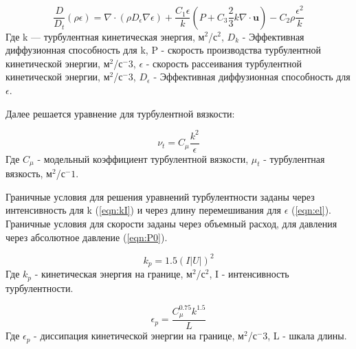 \documentclass[14pt,a4paper]{article}
\begin{document}
        \begin{equation}\label{eqn:e}
            \frac{D}{D_{t}}(\rho\epsilon) = \nabla \cdot (\rho D_{\epsilon}\nabla\epsilon) + \frac{C_{1}\epsilon}{k}(P + C_{3}\frac{2}{3}k\nabla \cdot \bm{u}) - C_{2}\rho\frac{\epsilon^2}{k}
        \end{equation} 
       Где k --- турбулентная кинетическая энергия, м$^2$/с$^2$, $D_{k}$ - Эффективная диффузионная способность для k, P - скорость производства турбулентной кинетической энергии, м$^2$/с$^-3$, $\epsilon$ - скорость рассеивания турбулентной кинетической энергии, м$^2$/с$^-3$, $D_{\epsilon}$ - Эффективная диффузионная способность для $\epsilon$.
               
        Далее решается уравнение для турбулентной вязкости:
        
        \begin{equation}\label{eqn:mu}
           \nu_{t} = C_{\mu}\frac{k^2}{\epsilon}
        \end{equation} 
        Где $C_{\mu}$ - модельный коэффициент турбулентной вязкости, $\mu_{t}$ - турбулентная вязкость, м$^2$/с$^-1$.
        
%        
        
        Граничные условия для решения уравнений турбулентности заданы через интенсивность для k (\ref{eqn:kI}) и через длину перемешивания для $\epsilon$ (\ref{eqn:el}). Граничные условия для скорости заданы через объемный расход, для давления через абсолютное давление (\ref{eqn:P0}).
        
        \begin{equation}\label{eqn:kI}
            k_{p} = 1.5 (I |U|)^2
        \end{equation}
        Где $k_{p}$ - кинетическая энергия на границе, м$^2$/с$^2$, I - интенсивность турбулентности.
        
        \begin{equation}\label{eqn:el}
            \epsilon_{p} = \frac{C_{\mu}^{0.75} k^{1.5}}{L}           
        \end{equation}
        Где $\epsilon_{p}$ - диссипация кинетической энергии на границе, м$^2$/с$^-3$, L - шкала длины.
        
\end{document}
